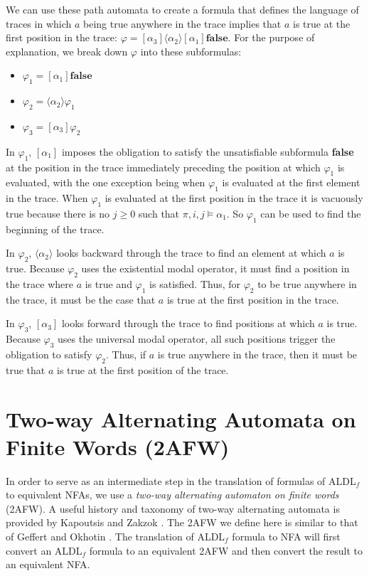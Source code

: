 \documentclass{lmcs}
\theoremstyle{definition}
\newcommand{\dbox}[1]{\langle #1 \rangle}
\newcommand{\bbox}[1]{[ #1 ]}
\DeclareMathOperator{\?}{?}
\begin{document}
We can use these path automata to create a formula that defines the language of traces in which $a$ being true anywhere in the trace implies that $a$ is true at the first position in the trace: $ \varphi = \bbox{\alpha_3} \dbox{\alpha_2} \bbox{\alpha_1} \textbf{false}$. For the purpose of explanation, we break down $\varphi$ into these subformulas:

\begin{itemize}
  \item $\varphi_1 = \bbox{\alpha_1}\textbf{false}$

  \item $\varphi_2 = \dbox{\alpha_2}\varphi_1$

  \item $\varphi_3 = \bbox{\alpha_3} \varphi_2$
\end{itemize}

In $\varphi_1$, $\bbox{\alpha_1}$ imposes the obligation to satisfy the unsatisfiable subformula \textbf{false} at the position in the trace immediately preceding the position at which $\varphi_1$ is evaluated, with the one exception being when $\varphi_1$ is evaluated at the first element in the trace. When $\varphi_1$ is evaluated at the first position in the trace it is vacuously true because there is no $j \geq 0$ such that $\pi,i,j \models \alpha_1$. So $\varphi_1$ can be used to find the beginning of the trace.

In $\varphi_2$, $\dbox{\alpha_2}$ looks backward through the trace to find an element at which $a$ is true. Because $\varphi_2$ uses the existential modal operator, it must find a position in the trace where $a$ is true and $\varphi_1$ is satisfied. Thus, for $\varphi_2$ to be true anywhere in the trace, it must be the case that $a$ is true at the first position in the trace.

In $\varphi_3$, $\bbox{\alpha_3}$ looks forward through the trace to find positions at which $a$ is true. Because $\varphi_3$ uses the universal modal operator, all such positions trigger the obligation to satisfy $\varphi_2$. Thus, if $a$ is true anywhere in the trace, then it must be true that $a$ is true at the first position of the trace.

\section{Two-way Alternating Automata on Finite Words (2AFW)}

\label{ch:introducing2afw}

In order to serve as an intermediate step in the translation of formulas of ALDL$_f$ to equivalent
NFAs, we use a \textit{two-way alternating automaton on finite words} (2AFW). A useful history and
taxonomy of two-way alternating automata is provided by Kapoutsis and Zakzok \cite{kapoutsis}. The 2AFW we
define here is similar to that of Geffert and Okhotin \cite{geffert}. The translation of ALDL$_f$ formula to NFA will first convert
an ALDL$_f$ formula to an equivalent 2AFW and then convert the result to an equivalent NFA.
\end{document}
